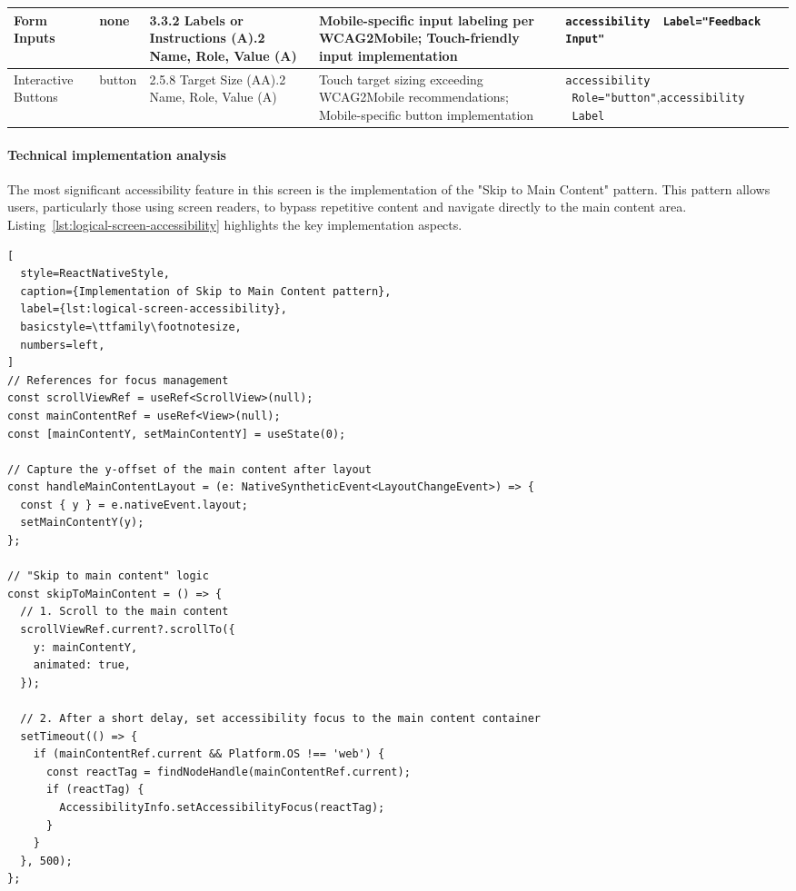 \begin{longtable}[c]{|C{2.5cm}|C{2cm}|C{2.8cm}|C{3.5cm}|C{4.7cm}|}
\hline
Form Inputs & none & 3.3.2 Labels or Instructions (A).2 Name, Role, Value (A) & Mobile-specific input labeling per WCAG2Mobile; Touch-friendly input implementation & \texttt{accessibility \ Label="Feedback Input"} \\
\hline
Interactive Buttons & button & 2.5.8 Target Size (AA).2 Name, Role, Value (A) & Touch target sizing exceeding WCAG2Mobile recommendations; Mobile-specific button implementation & \texttt{accessibility \ Role="button"},\newline \texttt{accessibility \ Label} \\
\hline
\end{longtable}
\FloatBarrier

\paragraph{Technical implementation analysis}

The most significant accessibility feature in this screen is the implementation of the "Skip to Main Content" pattern. This pattern allows users, particularly those using screen readers, to bypass repetitive content and navigate directly to the main content area. Listing~\ref{lst:logical-screen-accessibility} highlights the key implementation aspects.

\begin{lstlisting}[
  style=ReactNativeStyle,
  caption={Implementation of Skip to Main Content pattern},
  label={lst:logical-screen-accessibility},
  basicstyle=\ttfamily\footnotesize,
  numbers=left,
]
// References for focus management
const scrollViewRef = useRef<ScrollView>(null);
const mainContentRef = useRef<View>(null);
const [mainContentY, setMainContentY] = useState(0);

// Capture the y-offset of the main content after layout
const handleMainContentLayout = (e: NativeSyntheticEvent<LayoutChangeEvent>) => {
  const { y } = e.nativeEvent.layout;
  setMainContentY(y);
};

// "Skip to main content" logic
const skipToMainContent = () => {
  // 1. Scroll to the main content
  scrollViewRef.current?.scrollTo({
    y: mainContentY,
    animated: true,
  });

  // 2. After a short delay, set accessibility focus to the main content container
  setTimeout(() => {
    if (mainContentRef.current && Platform.OS !== 'web') {
      const reactTag = findNodeHandle(mainContentRef.current);
      if (reactTag) {
        AccessibilityInfo.setAccessibilityFocus(reactTag);
      }
    }
  }, 500);
};
\end{lstlisting}
\FloatBarrier

